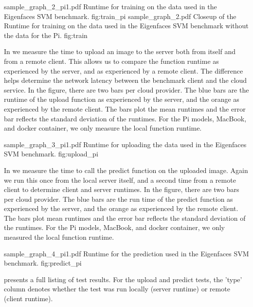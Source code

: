 \TwoFIGURES
    {sample_graph_2_pi1.pdf}
    {Runtime for training on the data used in the Eigenfaces SVM benchmark.}
    {fig:train_pi}
    {sample_graph_2.pdf}
    {Closeup of the Runtime for training on  the data used in the Eigenfaces SVM benchmark without the data for the Pi.}
    {fig:train}


In  we measure the time to upload an image to the server both
from itself and from a remote client. This allows us to compare the
function runtime as experienced by the server, and as experienced by a
remote client. The difference helps determine the network latency
between the benchmark client and the cloud service. In the figure, there are two bars per
cloud provider. The blue bars are the runtime of the upload function as
experienced by the server, and the orange as experienced by the remote
client. The bars plot the mean runtimes and the error bar reflects the
standard deviation of the runtimes. For the Pi models, MacBook, and docker container, we only measure the local function runtime.

\OneFIGURE
    {sample_graph_3_pi1.pdf}
    {Runtime for uploading the data used in the Eigenfaces SVM benchmark.}
    {fig:upload_pi}

In  we measure the time to call the predict function on the uploaded image. Again we run this once from the local server itself, and a second time from a remote client to determine client and server runtimes. In the figure, there are two bars per cloud provider. The blue bars are the run time of the predict function as experienced by the server, and the orange as experienced by the remote client. The bars plot mean runtimes and the error bar reflects the standard deviation of the runtimes. For the Pi models, MacBook, and docker container, we only measured the local function runtime.

\OneFIGURE
    {sample_graph_4_pi1.pdf}
    {Runtime for the prediction used in the Eigenfaces SVM benchmark.}
    {fig:predict_pi}

 presents a full listing of test results. For the upload and predict tests, the 'type' column denotes whether the test was run locally (server runtime) or remote (client runtime).

